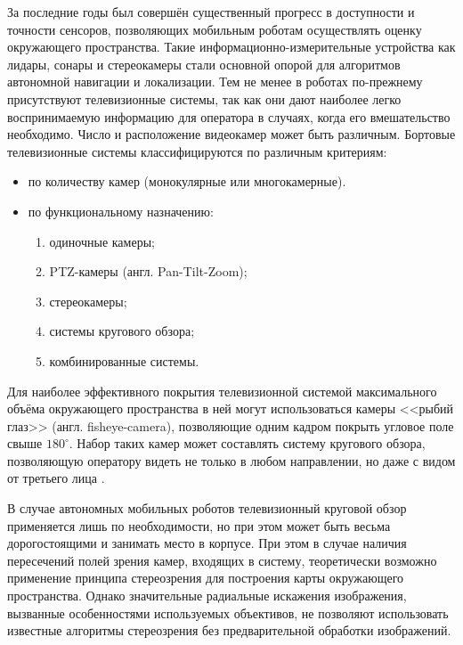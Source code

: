 За последние годы был совершён существенный прогресс в доступности и точности сенсоров, позволяющих мобильным роботам 
осуществлять оценку окружающего пространства. Такие информационно-измерительные устройства как лидары, сонары и стереокамеры
 стали основной опорой для алгоритмов автономной навигации и локализации. Тем не менее в роботах по-прежнему 
присутствуют телевизионные системы, так как они дают наиболее легко воспринимаемую информацию для оператора в случаях, когда 
его вмешательство необходимо. 
Число и расположение видеокамер может быть различным. Бортовые телевизионные системы классифицируются по различным 
критериям\cite{varlashin}:
\begin{itemize} 
    \item по количеству камер (монокулярные или многокамерные).
    \item по функциональному назначению:
    \begin{enumerate}[leftmargin=12mm]  %
        \item одиночные камеры;
        \item PTZ-камеры (англ. Pan-Tilt-Zoom);
        \item стереокамеры;
        \item системы кругового обзора;
        \item комбинированные системы.
    \end{enumerate}
\end{itemize}

Для наиболее эффективного покрытия телевизионной системой максимального объёма окружающего пространства в ней могут использоваться 
камеры <<рыбий глаз>> (англ. fisheye-camera), позволяющие одним кадром покрыть угловое поле свыше $180^\circ$.  
Набор таких камер может составлять систему кругового обзора, позволяющую оператору видеть не только в любом направлении,                
но даже с видом от третьего лица \cite{birdeye}. 
    
В случае автономных мобильных роботов телевизионный круговой обзор применяется лишь по необходимости, но при этом может быть весьма 
дорогостоящими и занимать место в корпусе. При этом в случае наличия пересечений полей зрения камер, входящих в систему, теоретически возможно 
применение принципа стереозрения для построения карты окружающего пространства. Однако значительные радиальные искажения изображения, вызванные 
особенностями используемых объективов, не позволяют использовать известные алгоритмы стереозрения без предварительной обработки изображений.                                   
 
